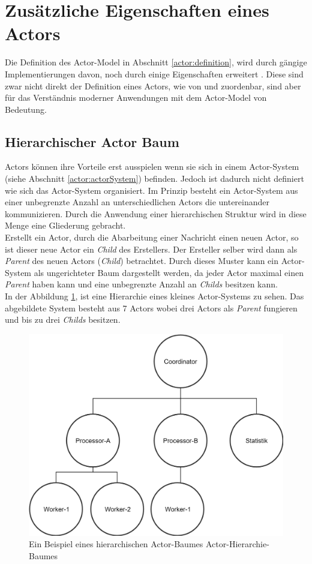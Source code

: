 \section{Zusätzliche Eigenschaften eines Actors}
Die Definition des Actor-Model in Abschnitt \ref{actor:definition}, wird durch gängige Implementierungen davon, noch durch einige Eigenschaften erweitert \citep{Vernon2015ReactiveAkka}. Diese sind zwar nicht direkt der Definition eines Actors, wie von \cite{Hewitt1973AIntelligence} und \cite{Agha1985ActorsSystems} zuordenbar, sind aber für das Verständnis moderner Anwendungen mit dem Actor-Model von Bedeutung.
\subsection{Hierarchischer Actor Baum}
Actors können ihre Vorteile erst ausspielen wenn sie sich in einem Actor-System (siehe Abschnitt \ref{actor:actorSystem}) befinden. Jedoch ist dadurch nicht definiert wie sich das Actor-System organisiert. Im Prinzip besteht ein Actor-System aus einer unbegrenzte Anzahl an unterschiedlichen Actors die untereinander kommunizieren. Durch die Anwendung einer hierarchischen Struktur wird in diese Menge eine Gliederung gebracht. \\
Erstellt ein Actor, durch die Abarbeitung einer Nachricht einen neuen Actor, so ist dieser neue Actor ein \textit{Child} des Erstellers. Der Ersteller selber wird dann als \textit{Parent} des neuen Actors (\textit{Child}) betrachtet. Durch dieses Muster kann ein Actor-System als ungerichteter Baum dargestellt werden, da jeder Actor maximal einen \textit{Parent} haben kann und eine unbegrenzte Anzahl an \textit{Childs} besitzen kann. \\
In der Abbildung \ref{fig:actor:actorHierarchySample}, ist eine Hierarchie eines kleines Actor-Systems zu sehen. Das abgebildete System besteht aus 7 Actors wobei drei Actors als \textit{Parent} fungieren und bis zu drei \textit{Childs} besitzen. 
\begin{figure}
  \centering
  \includegraphics[width=0.6\linewidth]{gfx/actor/actorHierarchy}
  \caption{Ein Beispiel eines hierarchischen Actor-Baumes Actor-Hierarchie-Baumes}
  \label{fig:actor:actorHierarchySample}
\end{figure}

